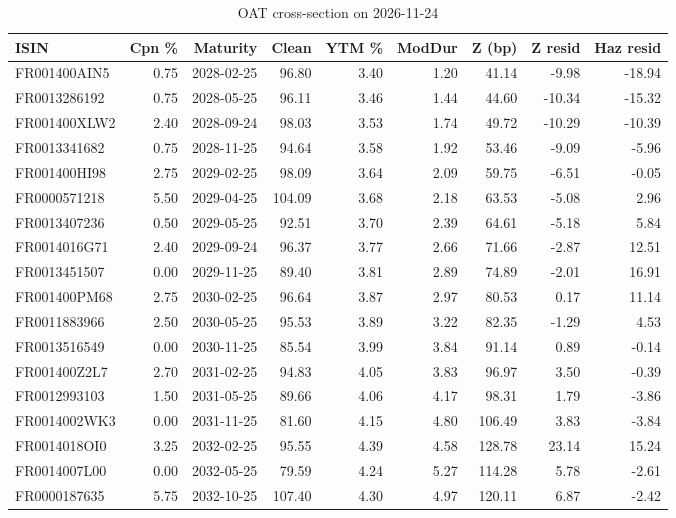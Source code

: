 \documentclass[10pt,a4paper]{article}
\begin{document}
\begin{table}[H]\centering\footnotesize
\caption{\label{tab:snap}OAT cross-section on 2026-11-24}
\begin{tabular}{lrrrrrrrr}\toprule
\textbf{ISIN} & \textbf{Cpn \%} & \textbf{Maturity} & \textbf{Clean} & \textbf{YTM \%} & \textbf{ModDur} & \textbf{Z (bp)} & \textbf{Z resid} & \textbf{Haz resid} \\ \midrule
FR001400AIN5 & 0.75 & 2028-02-25 & 96.80 & 3.40 & 1.20 & 41.14 & -9.98 & -18.94 \\
FR0013286192 & 0.75 & 2028-05-25 & 96.11 & 3.46 & 1.44 & 44.60 & -10.34 & -15.32 \\
FR001400XLW2 & 2.40 & 2028-09-24 & 98.03 & 3.53 & 1.74 & 49.72 & -10.29 & -10.39 \\
FR0013341682 & 0.75 & 2028-11-25 & 94.64 & 3.58 & 1.92 & 53.46 & -9.09 & -5.96 \\
FR001400HI98 & 2.75 & 2029-02-25 & 98.09 & 3.64 & 2.09 & 59.75 & -6.51 & -0.05 \\
FR0000571218 & 5.50 & 2029-04-25 & 104.09 & 3.68 & 2.18 & 63.53 & -5.08 & 2.96 \\
FR0013407236 & 0.50 & 2029-05-25 & 92.51 & 3.70 & 2.39 & 64.61 & -5.18 & 5.84 \\
FR0014016G71 & 2.40 & 2029-09-24 & 96.37 & 3.77 & 2.66 & 71.66 & -2.87 & 12.51 \\
FR0013451507 & 0.00 & 2029-11-25 & 89.40 & 3.81 & 2.89 & 74.89 & -2.01 & 16.91 \\
FR001400PM68 & 2.75 & 2030-02-25 & 96.64 & 3.87 & 2.97 & 80.53 & 0.17 & 11.14 \\
FR0011883966 & 2.50 & 2030-05-25 & 95.53 & 3.89 & 3.22 & 82.35 & -1.29 & 4.53 \\
FR0013516549 & 0.00 & 2030-11-25 & 85.54 & 3.99 & 3.84 & 91.14 & 0.89 & -0.14 \\
FR001400Z2L7 & 2.70 & 2031-02-25 & 94.83 & 4.05 & 3.83 & 96.97 & 3.50 & -0.39 \\
FR0012993103 & 1.50 & 2031-05-25 & 89.66 & 4.06 & 4.17 & 98.31 & 1.79 & -3.86 \\
FR0014002WK3 & 0.00 & 2031-11-25 & 81.60 & 4.15 & 4.80 & 106.49 & 3.83 & -3.84 \\
FR0014018OI0 & 3.25 & 2032-02-25 & 95.55 & 4.39 & 4.58 & 128.78 & 23.14 & 15.24 \\
FR0014007L00 & 0.00 & 2032-05-25 & 79.59 & 4.24 & 5.27 & 114.28 & 5.78 & -2.61 \\
FR0000187635 & 5.75 & 2032-10-25 & 107.40 & 4.30 & 4.97 & 120.11 & 6.87 & -2.42 \\

\end{tabular}
\end{table}
\end{document}
